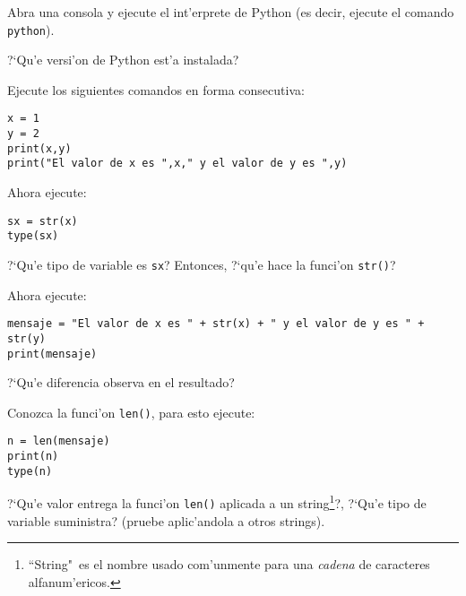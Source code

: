 \documentclass[11pt]{exam}
\begin{document}
\firstpageheadrule
\runningheadrule
{}
\cfoot{ }
\begin{flushleft}
\vspace{0.2in}

\vspace{0.25cm}
\end{flushleft}

\begin{questions}

\item Abra una consola y ejecute el int'erprete de Python (es decir, ejecute el comando \texttt{python}). 
\begin{parts}
\item ?`Qu'e versi'on de Python est'a instalada?
\item Ejecute los siguientes comandos en forma consecutiva:

\begin{verbatim}
x = 1
y = 2
print(x,y)
print("El valor de x es ",x," y el valor de y es ",y)
\end{verbatim}
\item Ahora ejecute:

\begin{verbatim}
sx = str(x)
type(sx)
\end{verbatim}

?`Qu'e tipo de variable es \texttt{sx}? Entonces, ?`qu'e hace la funci'on \texttt{str()}?
\item Ahora ejecute:

\begin{verbatim}
mensaje = "El valor de x es " + str(x) + " y el valor de y es " + str(y)
print(mensaje)
\end{verbatim}

?`Qu'e diferencia observa en el resultado?
\item Conozca la funci'on \texttt{len()}, para esto ejecute:

\begin{verbatim}
n = len(mensaje)
print(n)
type(n)
\end{verbatim}

?`Qu'e valor entrega la funci'on \texttt{len()} aplicada a un string\footnote{``String"\, es el nombre usado com'unmente para una \textit{cadena} de caracteres alfanum'ericos.}?, ?`Qu'e tipo de variable suministra? (pruebe aplic'andola a otros strings).


\end{parts}
\end{questions}
\end{document}
